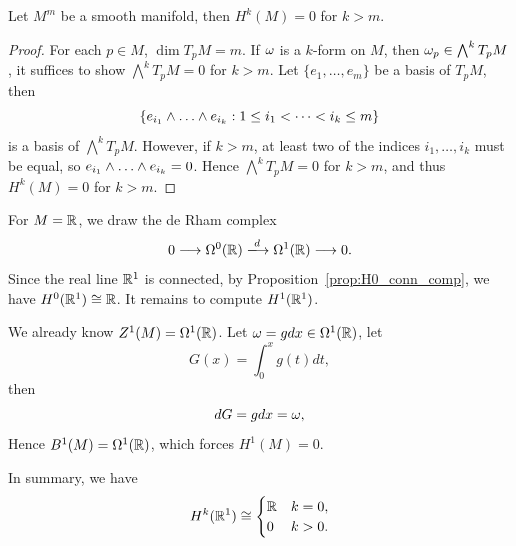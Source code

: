 \begin{proposition}\label{prop:Hk_vanish}
    Let \(M^m\) be a smooth manifold, then \(H^k(M) = 0\) for \(k > m\).
\end{proposition}
\begin{proof}
    For each \(p\in M\), \(\dim T_pM = m\). If \(\omega\) is a \(k\)-form on \(M\), then \(\omega_p\in\bigwedge^kT_pM\), it suffices to show \(\bigwedge^kT_pM = 0\) for \(k > m\). Let \(\{e_1,\dots,e_m\}\) be a basis of \(T_pM\), then \[
        \{e_{i_1}\wed\dots\wed e_{i_k} : 1\le i_1 < \cdots < i_k \le m\}
    \] is a basis of \(\bigwedge^kT_pM\). However, if \(k > m\), at least two of the indices \(i_1,\dots,i_k\) must be equal, so \(e_{i_1}\wed\dots\wed e_{i_k} = 0\). Hence \(\bigwedge^kT_pM = 0\) for \(k > m\), and thus \(H^k(M) = 0\) for \(k > m\).
\end{proof}

\begin{example}
    For \(M = \mathbb{R}\), we draw the de Rham complex \[
        0 \longrightarrow \Omg^0(\R) \xlongrightarrow{d} \Omg^1(\R) \longrightarrow 0.
    \]
    Since the real line \(\mathbb{R}^1\) is connected, by Proposition~\ref{prop:H0_conn_comp}, we have \(H^0(\mathbb{R}^1)\cong \mathbb{R}\).  It remains to compute \(H^1(\mathbb{R}^1)\). 
    \begin{roof}
        We already know \(Z^1(M) = \Omega^1(\mathbb{R})\). Let \(\omega = g dx\in\Omega^1(\mathbb{R})\), let \[
            G(x) = \int_0^x g(t)dt,
        \] then \[
            dG = g dx = \omega,
        \]
        Hence \(B^1(M) = \Omega^1(\mathbb{R})\), which forces \(H^1(M) = 0\).
    \end{roof}
    In summary, we have \[
        H^k(\mathbb{R}^1) \cong \begin{cases}
            \mathbb{R} & k = 0,\\
            0 & k > 0.
        \end{cases}
    \]
\end{example}

\newpage

